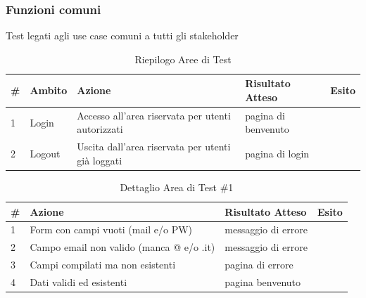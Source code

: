 \documentclass[a4paper,12pt]{article}
\begin{document}
\pagebreak

\subsubsection{Funzioni comuni}
Test legati agli use case comuni a tutti gli stakeholder


\begin{table}[ht]
\begin{center}
\caption{Riepilogo Aree di Test}
\begin{tabular}{p{0.5cm} p{1.5cm} p{6cm} p{3.5cm} p{1cm}}
\rowcolor{Ash}
\hline
\# & Ambito & Azione & Risultato Atteso & Esito \\ \hline
1 &  Login	  &  Accesso all'area riservata per utenti autorizzati	& pagina di benvenuto	&	\cellcolor{green}{OK}\\
2 & Logout &  Uscita dall'area riservata per utenti già  loggati		& pagina di login &	\cellcolor{green}{OK}\\ \hline
\end{tabular}
\end{center}
\end{table}



\begin{table}[ht]
\begin{center}
\caption{Dettaglio Area di Test \#1}
\begin{tabular}{p{0.5cm} p{8cm} p{3.5cm} p{1cm}}
\rowcolor{Ash}
\hline
\# & Azione & Risultato Atteso & Esito \\ \hline
1 & Form con campi vuoti (mail e/o PW)		 &	messaggio di errore		&	\cellcolor{green}{OK}\\
2 & Campo email non valido (manca @ e/o .it)	 &     messaggio di errore		&	\cellcolor{green}{OK}\\
3 & Campi compilati ma non esistenti		 &	pagina di errore	        &	\cellcolor{green}{OK}\\
4 & Dati validi ed esistenti				 &	pagina benvenuto		&	\cellcolor{green}{OK}\\ \hline
\end{tabular}
\end{center}
\end{table}
\end{document}
